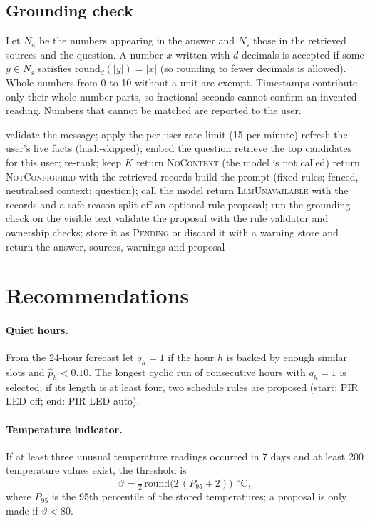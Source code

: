 \documentclass[12pt,a4paper,oneside]{report}
\begin{document}
\subsection{Grounding check}
Let $N_a$ be the numbers appearing in the answer and $N_s$ those in the retrieved sources and the question. A number $x$ written with $d$ decimals is accepted if some $y\in N_s$ satisfies $\mathrm{round}_d(|y|)=|x|$ (so rounding to fewer decimals is allowed). Whole numbers from 0 to 10 without a unit are exempt. Timestamps contribute only their whole-number parts, so fractional seconds cannot confirm an invented reading. Numbers that cannot be matched are reported to the user.

\begin{algorithm}[H]
\caption{Answering a question}
\label{alg:answer}
\begin{algorithmic}[1]
\State validate the message; apply the per-user rate limit (15 per minute)
\State refresh the user's live facts (hash-skipped); embed the question
\State retrieve the top candidates for this user; re-rank; keep $K$
 \State return \textsc{NoContext} (the model is not called) \EndIf
{} \State return \textsc{NotConfigured} with the retrieved records \EndIf
\State build the prompt (fixed rules; fenced, neutralised context; question); call the model
 \State return \textsc{LlmUnavailable} with the records and a safe reason \EndIf
\State split off an optional rule proposal; run the grounding check on the visible text
\State validate the proposal with the rule validator and ownership checks; store it as \textsc{Pending} or discard it with a warning
\State store and return the answer, sources, warnings and proposal
\end{algorithmic}
\end{algorithm}

\section{Recommendations}
\paragraph{Quiet hours.} From the 24-hour forecast let $q_h=1$ if the hour $h$ is backed by enough similar slots and $\hat p_h<0.10$. The longest cyclic run of consecutive hours with $q_h=1$ is selected; if its length is at least four, two schedule rules are proposed (start: PIR LED off; end: PIR LED auto).
\paragraph{Temperature indicator.} If at least three unusual temperature readings occurred in 7 days and at least 200 temperature values exist, the threshold is
\begin{equation}
  \vartheta=\tfrac12\,\mathrm{round}\big(2\,(P_{95}+2)\big)\ \ {}^{\circ}\mathrm{C},
\end{equation}
where $P_{95}$ is the 95th percentile of the stored temperatures; a proposal is only made if $\vartheta<80$.
\end{document}
